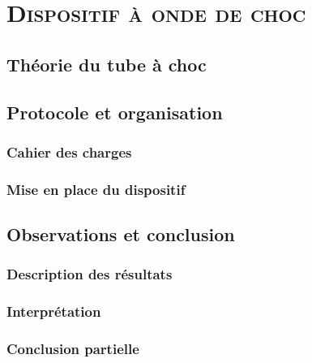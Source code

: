 \renewcommand{\chaptername}{\scshape Partie}
\chapter{\normalfont \scshape Dispositif à onde de choc}
\section{Théorie du tube à choc}
\section{Protocole et organisation}
\subsection{Cahier des charges}
\subsection{Mise en place du dispositif}
\section{Observations et conclusion}
\subsection{Description des résultats}
\subsection{Interprétation}
\subsection{Conclusion partielle}